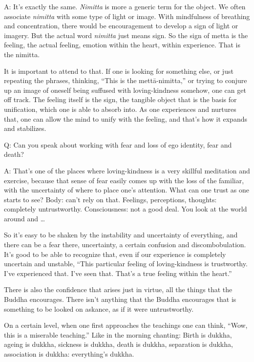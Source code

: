 \qaspace
A: It’s exactly the same. \emph{Nimitta} is more a generic term for the
object. We often associate \emph{nimitta} with some type of light or
image. With mindfulness of breathing and concentration, there would be
encouragement to develop a sign of light or imagery. But the actual word
\emph{nimitta} just means sign. So the sign of metta is the feeling, the
actual feeling, emotion within the heart, within experience. That is the
nimitta.

It is important to attend to that. If one is looking for something else,
or just repeating the phrases, thinking, “This is the mettā-nimitta,” or
trying to conjure up an image of oneself being suffused with
loving-kindness somehow, one can get off track. The feeling itself is
the sign, the tangible object that is the basis for unification, which
one is able to absorb into. As one experiences and nurtures that, one
can allow the mind to unify with the feeling, and that’s how it expands
and stabilizes.

\qaspace
Q: Can you speak about working with fear and loss of ego identity, fear
and death?

\qaspace
A: That’s one of the places where loving-kindness is a very skillful
meditation and exercise, because that sense of fear easily comes up with
the loss of the familiar, with the uncertainty of where to place one’s
attention. What can one trust as one starts to see? Body: can’t rely on
that. Feelings, perceptions, thoughts: completely untrustworthy.
Consciousness: not a good deal. You look at the world around and \ldots{}

So it’s easy to be shaken by the instability and uncertainty of
everything, and there can be a fear there, uncertainty, a certain
confusion and discombobulation. It’s good to be able to recognize that,
even if our experience is completely uncertain and unstable, “This
particular feeling of loving-kindness is trustworthy. I’ve experienced
that. I’ve seen that. That’s a true feeling within the heart.”

There is also the confidence that arises just in virtue, all the things
that the Buddha encourages. There isn’t anything that the Buddha
encourages that is something to be looked on askance, as if it were
untrustworthy.

On a certain level, when one first approaches the teachings one can
think, “Wow, this is a miserable teaching.” Like in the morning
chanting: Birth is dukkha, ageing is dukkha, sickness is dukkha, death
is dukkha, separation is dukkha, association is dukkha: everything’s
dukkha.

